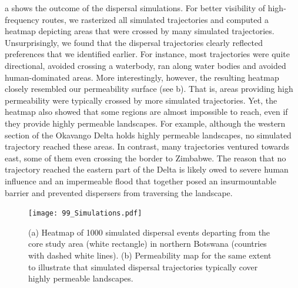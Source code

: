 \documentclass[abstract=on,10pt,a4paper,bibliography=totocnumbered]{scrartcl}
\begin{document}
\newpage
\noindent {}a shows the outcome of the dispersal simulations.
For better visibility of high-frequency routes, we rasterized all simulated
trajectories and computed a heatmap depicting areas that were crossed by many
simulated trajectories. Unsurprisingly, we found that the dispersal trajectories
clearly reflected preferences that we identified earlier. For instance, most
trajectories were quite directional, avoided crossing a waterbody, ran along
water bodies and avoided human-dominated areas. More interestingly, however, the
resulting heatmap closely resembled our permeability surface (see
b). That is, areas providing high permeability were typically
crossed by more simulated trajectories. Yet, the heatmap also showed that some
regions are almost impossible to reach, even if they provide highly permeable
landscapes. For example, although the western section of the Okavango Delta
holds highly permeable landscapes, no simulated trajectory reached these areas.
In contrast, many trajectories ventured towards east, some of them even crossing
the border to Zimbabwe. The reason that no trajectory reached the eastern part
of the Delta is likely owed to severe human influence and an impermeable flood
that together posed an insurmountable barrier and prevented dispersers from
traversing the landscape.

\begin{figure}[h]
  \begin{center}
    \texttt{[image: 99\_Simulations.pdf]}
    \caption{(a) Heatmap of 1000 simulated dispersal events departing from the
    core study area (white rectangle) in northern Botswana (countries with
    dashed white lines). (b) Permeability map for the same extent to illustrate
    that simulated dispersal trajectories typically cover highly permeable
    landscapes.}
    \label{Simulations}
  \end{center}
\end{figure}
\end{document}
